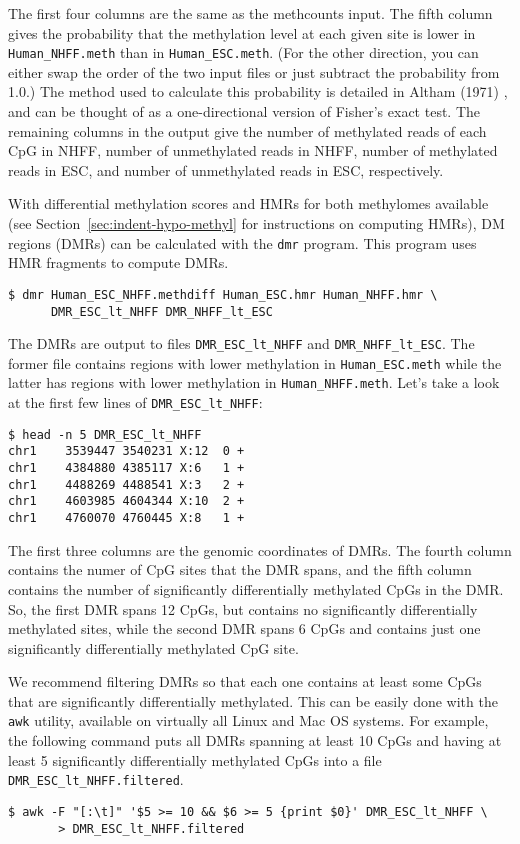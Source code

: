 \documentclass[10pt]{article}
\newcommand{\prog}[1]{\texttt{#1}}
\newcommand{\fn}[1]{\texttt{#1}}
\begin{document}
The first four columns are the same as the methcounts input. The fifth 
column gives the probability that the methylation level at each given 
site is lower in \fn{Human\_NHFF.meth} than in \fn{Human\_ESC.meth}. 
(For the other direction, you can either swap the order of the two 
input files or just subtract the probability from 1.0.) The method used 
to calculate this probability is detailed in Altham (1971) 
\cite{altham1969exact}, and can be thought of as a one-directional 
version of Fisher's exact test.  The remaining columns in the output 
give the number of methylated reads of each CpG in NHFF, number of unmethylated
reads in  NHFF, number of methylated reads in ESC, and number of unmethylated
reads in ESC, respectively.

With differential methylation scores and HMRs for both methylomes 
available (see Section~\ref{sec:indent-hypo-methyl} for instructions 
on computing HMRs), DM regions (DMRs) can be calculated with the 
\prog{dmr} program. This program uses HMR fragments to compute 
DMRs.

{\small{%
\begin{verbatim}
$ dmr Human_ESC_NHFF.methdiff Human_ESC.hmr Human_NHFF.hmr \
      DMR_ESC_lt_NHFF DMR_NHFF_lt_ESC
\end{verbatim}%
}}
The DMRs are output to files {\tt DMR\_ESC\_lt\_NHFF} and 
{\tt DMR\_NHFF\_lt\_ESC}. The former file contains regions with 
lower methylation in {\tt Human\_ESC.meth} while the latter  has 
regions with lower methylation in {\tt Human\_NHFF.meth}. Let's take 
a look at the first few lines of {\tt DMR\_ESC\_lt\_NHFF}:

{\small{%
\begin{verbatim}
$ head -n 5 DMR_ESC_lt_NHFF
chr1	3539447	3540231	X:12  0	+
chr1	4384880	4385117	X:6	  1	+
chr1	4488269	4488541	X:3	  2	+
chr1	4603985	4604344	X:10  2	+
chr1	4760070	4760445	X:8   1	+
\end{verbatim}%
}}

The first three columns are the genomic coordinates of DMRs. The fourth
column contains the numer of CpG sites that the DMR spans, and the fifth 
column contains the number of significantly differentially methylated 
CpGs in the DMR. So, the first DMR spans 12 CpGs, but contains no 
significantly differentially methylated sites, while the second DMR spans 
6 CpGs and contains just one significantly differentially methylated CpG 
site.

We recommend filtering DMRs so that each one contains at least some 
CpGs that are significantly differentially methylated. This can be easily 
done with the {\tt awk} utility, available on virtually all Linux and Mac OS 
systems. For example, the following command puts all DMRs spanning 
at least 10 CpGs and having at least 5 significantly differentially 
methylated CpGs into a file {\tt DMR\_ESC\_lt\_NHFF.filtered}.
{\small{%
\begin{verbatim}
$ awk -F "[:\t]" '$5 >= 10 && $6 >= 5 {print $0}' DMR_ESC_lt_NHFF \
       > DMR_ESC_lt_NHFF.filtered
\end{verbatim}%
}}
\end{document}
